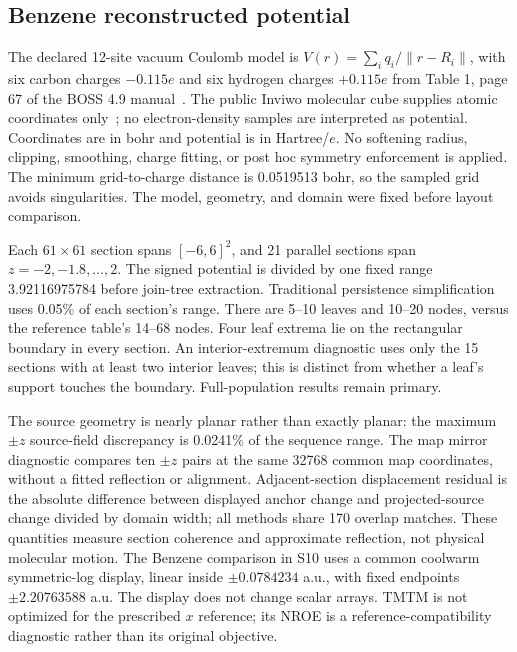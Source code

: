 \subsection{Benzene reconstructed potential}
The declared 12-site vacuum Coulomb model is $V(r)=\sum_iq_i/\|r-R_i\|$, with six carbon charges $-0.115e$ and six hydrogen charges $+0.115e$ from Table 1, page 67 of the BOSS 4.9 manual~\cite{Jorgensen:2013:BOSS}. The public Inviwo molecular cube supplies atomic coordinates only~\cite{Inviwo:BenzeneGeometry}; no electron-density samples are interpreted as potential. Coordinates are in bohr and potential is in Hartree/$e$. No softening radius, clipping, smoothing, charge fitting, or post hoc symmetry enforcement is applied. The minimum grid-to-charge distance is 0.0519513 bohr, so the sampled grid avoids singularities. The model, geometry, and domain were fixed before layout comparison.

Each $61\times61$ section spans $[-6,6]^2$, and 21 parallel sections span $z=-2,-1.8,\ldots,2$. The signed potential is divided by one fixed range 3.92116975784 before join-tree extraction. Traditional persistence simplification uses 0.05\% of each section's range. There are 5--10 leaves and 10--20 nodes, versus the reference table's 14--68 nodes. Four leaf extrema lie on the rectangular boundary in every section. An interior-extremum diagnostic uses only the 15 sections with at least two interior leaves; this is distinct from whether a leaf's support touches the boundary. Full-population results remain primary.

The source geometry is nearly planar rather than exactly planar: the maximum $\pm z$ source-field discrepancy is 0.0241\% of the sequence range. The map mirror diagnostic compares ten $\pm z$ pairs at the same 32768 common map coordinates, without a fitted reflection or alignment. Adjacent-section displacement residual is the absolute difference between displayed anchor change and projected-source change divided by domain width; all methods share 170 overlap matches. These quantities measure section coherence and approximate reflection, not physical molecular motion. The Benzene comparison in S10 uses a common coolwarm symmetric-log display, linear inside $\pm0.0784234$ a.u., with fixed endpoints $\pm2.20763588$ a.u. The display does not change scalar arrays. TMTM is not optimized for the prescribed $x$ reference; its NROE is a reference-compatibility diagnostic rather than its original objective.

